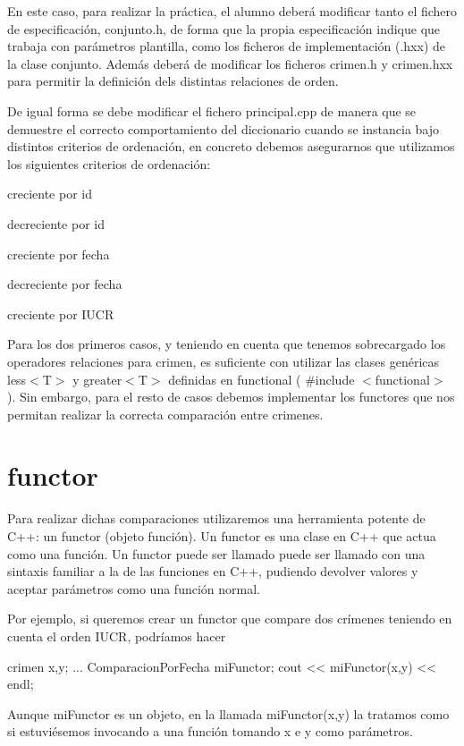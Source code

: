 En este caso, para realizar la práctica, el alumno deberá modificar tanto el fichero de especificación, conjunto.\-h, de forma que la propia especificación indique que trabaja con parámetros plantilla, como los ficheros de implementación (.hxx) de la clase conjunto. Además deberá de modificar los ficheros crimen.\-h y crimen.\-hxx para permitir la definición dels distintas relaciones de orden.

De igual forma se debe modificar el fichero principal.\-cpp de manera que se demuestre el correcto comportamiento del diccionario cuando se instancia bajo distintos criterios de ordenación, en concreto debemos asegurarnos que utilizamos los siguientes criterios de ordenación\-:

\begin{DoxyItemize}
\item creciente por id \item decreciente por id \item creciente por fecha \item decreciente por fecha \item creciente por I\-U\-C\-R\end{DoxyItemize}
Para los dos primeros casos, y teniendo en cuenta que tenemos sobrecargado los operadores relaciones para crimen, es suficiente con utilizar las clases genéricas less$<$\-T$>$ y greater$<$\-T$>$ definidas en functional ( \#include $<$functional$>$ ). Sin embargo, para el resto de casos debemos implementar los functores que nos permitan realizar la correcta comparación entre crimenes.\hypertarget{index_functor}{}\section{functor}\label{index_functor}
Para realizar dichas comparaciones utilizaremos una herramienta potente de C++\-: un functor (objeto función). Un functor es una clase en C++ que actua como una función. Un functor puede ser llamado puede ser llamado con una sintaxis familiar a la de las funciones en C++, pudiendo devolver valores y aceptar parámetros como una función normal.

Por ejemplo, si queremos crear un functor que compare dos crímenes teniendo en cuenta el orden I\-U\-C\-R, podríamos hacer


\begin{DoxyCode}
crimen x,y;
...
ComparacionPorFecha miFunctor;
cout << miFunctor(x,y) << endl;
\end{DoxyCode}
 Aunque mi\-Functor es un objeto, en la llamada mi\-Functor(x,y) la tratamos como si estuviésemos invocando a una función tomando x e y como parámetros.

